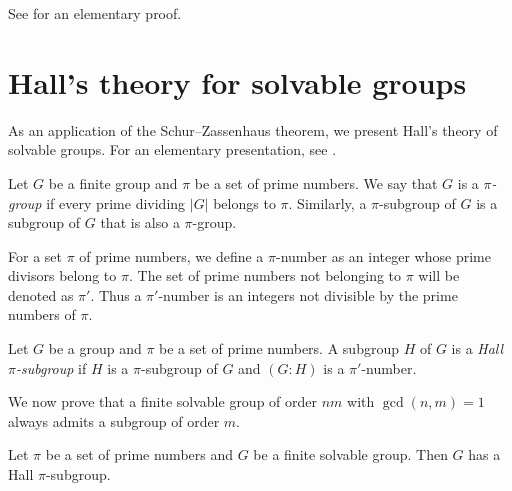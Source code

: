 See \cite{MR294497} for an elementary proof. 

\section{Hall's theory for solvable groups}

As an application of the Schur--Zassenhaus theorem, 
we present Hall's theory of solvable groups. 
For an elementary presentation, see \cite{MR600654}. 

\begin{definition}
Let $G$ be a finite group and $\pi$ be a set of prime numbers. We say that 
$G$ is a \emph{$\pi$-group} if every prime dividing $|G|$ belongs to $\pi$. 
Similarly, a $\pi$-subgroup of $G$ is a subgroup of $G$ that is also a $\pi$-group.  
\end{definition}

For a set $\pi$ of prime numbers, 
we define a $\pi$-number as an integer whose prime divisors 
belong to $\pi$. The set of prime numbers not belonging to $\pi$ will be denoted 
as $\pi'$. Thus a $\pi'$-number is an integers not divisible by 
the prime numbers of $\pi$. 

\begin{definition}
	Let $G$ be a group and $\pi$ be a set of prime numbers. A subgroup $H$ of $G$ 
    is a \emph{Hall $\pi$-subgroup} if $H$ is a $\pi$-subgroup of $G$ and 
    $(G:H)$ is a $\pi'$-number.
\end{definition}

We now prove that a finite solvable group of order $nm$ with $\gcd(n,m)=1$ 
always admits a subgroup of order $m$. 

\begin{theorem}
 	\label{theorem:HallE}
	Let $\pi$ be a set of prime numbers and $G$ be a finite solvable group. 
    Then $G$ has a Hall $\pi$-subgroup. 
\end{theorem}

